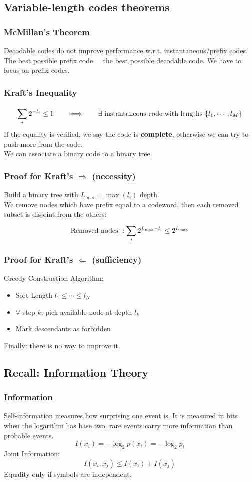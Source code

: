 \subsection{Variable-length codes theorems}
\subsubsection{McMillan's Theorem}
Decodable codes do not improve performance w.r.t. instantaneous/prefix codes.\\
The best possible prefix code = the best possible decodable code. We have to focus on prefix codes.
\subsubsection{Kraft's Inequality}
$$\sum_{i}^{}2^{-l_i} \leq 1 \qquad \Longleftrightarrow \qquad \exists \ \text{instantaneous code with lengths } \{l_1, \cdots, l_M\}$$
If the equality is verified, we say the code is \textbf{complete}, otherwise we can try to push more from the code.\\
We can associate a binary code to a binary tree.
\subsubsection{Proof for Kraft's $\Rightarrow$ (necessity)}
Build a binary tree with $L_{\max} = \max(l_i)$ depth.\\
We remove nodes which have prefix equal to a codeword, then each removed subset is disjoint from the others:
$$\text{Removed nodes }: \sum_{i}^{}2^{L_{\max} - l_i} \leq 2^{L_{\max}}$$
\subsubsection{Proof for Kraft's $\Leftarrow$ (sufficiency)}
Greedy Construction Algorithm:
\begin{itemize}
    \item Sort Length $l_1 \leq \cdots \leq l_N$
    \item $\forall$ step $k$: pick available node at depth $l_k$
    \item Mark descendants as forbidden
\end{itemize}
Finally: there is no way to improve it.
\subsection{Recall: Information Theory}
\subsubsection{Information}
Self-information measures how surprising one event is. It is measured in bits when the logarithm has base two: rare events carry more information than probable events.
$$I(x_i) = - \log_2 p(x_i) = -\log_2 p_i$$
Joint Information:
$$I(x_i,x_j) \leq I(x_i) + I(x_j)$$
Equality only if symbols are independent.
